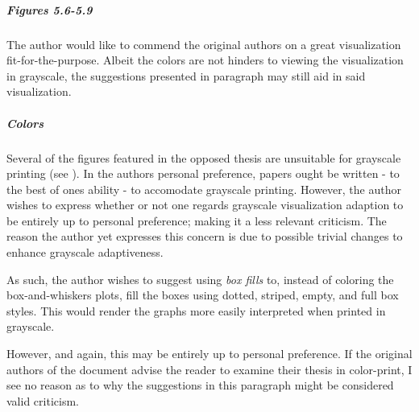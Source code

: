 \subparagraph{Figures 5.6-5.9}
\label{par:visualization_figuresfivepointsixtofivepointnine}
The author would like to commend the original authors on a great visualization fit-for-the-purpose.
Albeit the colors are not hinders to viewing the visualization in grayscale, the suggestions presented in paragraph  may still aid in said visualization.

\subparagraph{Colors}
\label{par:visualization_colors}
Several of the figures featured in the opposed thesis are unsuitable for grayscale printing (see ).
In the authors personal preference, papers ought be written - to the best of ones ability - to accomodate grayscale printing.
However, the author wishes to express whether or not one regards grayscale visualization adaption to be entirely up to personal preference; making it a less relevant criticism.
The reason the author yet expresses this concern is due to possible trivial changes to enhance grayscale adaptiveness.

As such, the author wishes to suggest using \textit{box fills} to, instead of coloring the box-and-whiskers plots, fill the boxes using dotted, striped, empty, and full box styles.
This would render the graphs more easily interpreted when printed in grayscale.

However, and again, this may be entirely up to personal preference.
If the original authors of the document advise the reader to examine their thesis in color-print, I see no reason as to why the suggestions in this paragraph might be considered valid criticism.